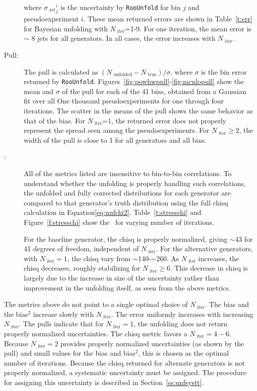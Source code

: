 \begin{description}
where ${\sigma_{\textrm{ ret}}}^{i}_{j}$ is the uncertainty by \texttt{RooUnfold} for bin $j$ and pseudoexperiment $i$. These mean \textrm{ ret}urned errors are shown in Table~\ref{t:err} for Bayesian unfolding with $N_{\textrm{ iter}}$=1-9. For one iteration, the mean error is $\sim$ 8 jets for all generators. In all cases, the error increases with $N_{\textrm{ iter}}$.
\item[Pull:] The pull is calculated as $(N_{\textrm{ unfolded}}-N_{\textrm{ true}})/\sigma$, where $\sigma$ is the bin error \textrm{ ret}urned by \texttt{RooUnfold}.
Figures~\ref{fig:powhwpull}-\ref{fig:mcnlopull} show the mean and $\sigma$ of the pull for each of the 41 bins, obtained from a Gaussian fit over all One thousand pseudoexperiments for one through four iterations. The scatter in the means of the pull shows the same behavior as that of the bias. For $N_{\textrm{ iter}}$=1, the \textrm{ ret}urned error does not properly represent the spread seen among the pseudoexperiments. For $N_{\textrm{ iter}} \geq 2$, the width of the pull is close to 1 for all generators and all bins.  
\item[\chisq:] All of the metrics listed are insensitive to bin-to-bin correlations. To understand whether the unfolding is properly handling such correlations, the unfolded and fully corrected distributions for each generator are compared to that generator's truth distribution using the full chisq calculation in Equation\ref{eq:unfchi2}. Table~\ref{t:stresschi} and Figure~\ref{f:stresschi} show the \chisq\ for varying number of iterations.

For the baseline generator, the chisq is properly normalized, giving $\sim$43 for 41 degrees of freedom, independent of $N_{\textrm{ iter}}$. For the alternative generators, with $N_{\textrm{ iter}}=1$, the chisq vary from $\sim$140-$\sim$260. As $N_{\textrm{ iter}}$ increases, the chisq decreases, roughly stabilizing for $N_{\textrm{ iter}} \geq 6$. This decrease in chisq is largely due to the increase in size of the uncertainty rather than improvement in the unfolding itself, as seen from the above metrics. 
\end{description}
The metrics above do not point to a single optimal choice of $N_{\textrm{ iter}}$. The bias and the bias$^{2}$ increase slowly with $N_{\textrm{ iter}}$. The error uniformly increases with increasing $N_{\textrm{ iter}}$. The pulls indicate that for $N_{\textrm{ iter}}=1$, the unfolding does not \textrm{ ret}urn properly normalized uncertainties. The chisq metric favors a $N_{\textrm{ iter}}=4-6$. Because $N_{\textrm{ iter}}=2$ provides properly normalized uncertainties (as shown by the pull) and small values for the bias and bias$^2$, this is chosen as the optimal number of iterations. Because the chisq \textrm{ ret}urned for alternate generators is not properly normalized, a systematic uncertainty must be assigned. The procedure for assigning this uncertainty is described in Section~\ref{ss:unfsystt}. 


